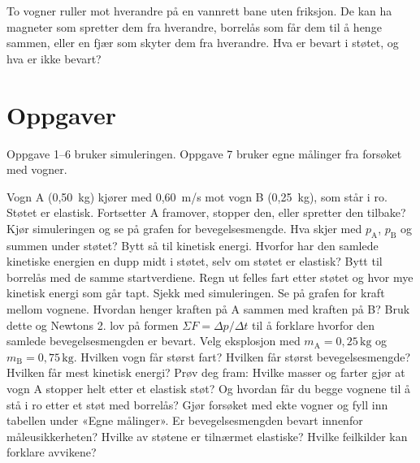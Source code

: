 \documentclass[11pt]{article}
\begin{document}

To vogner ruller mot hverandre på en vannrett bane uten friksjon. De kan ha magneter som spretter dem fra hverandre, borrelås som får dem til å henge sammen, eller en fjær som skyter dem fra hverandre. Hva er bevart i støtet, og hva er ikke bevart?

\section*{Oppgaver}

Oppgave 1–6 bruker simuleringen. Oppgave 7 bruker egne målinger fra forsøket med vogner.

\begin{oppgaveliste}
\oppgave {}Vogn A (0,50~kg) kjører med 0,60~m/s mot vogn B (0,25~kg), som står i ro. Støtet er elastisk. Fortsetter A framover, stopper den, eller spretter den tilbake?
\svar
\oppgave {}Kjør simuleringen og se på grafen for bevegelsesmengde. Hva skjer med $p_{\mathrm{A}}$, $p_{\mathrm{B}}$ og summen under støtet? Bytt så til kinetisk energi. Hvorfor har den samlede kinetiske energien en dupp midt i støtet, selv om støtet er elastisk?
\svar
\oppgave {}Bytt til borrelås med de samme startverdiene. Regn ut felles fart etter støtet og hvor mye kinetisk energi som går tapt. Sjekk med simuleringen.
\svar
\oppgave {}Se på grafen for kraft mellom vognene. Hvordan henger kraften på A sammen med kraften på B? Bruk dette og Newtons 2. lov på formen $ΣF = Δp/Δt$ til å forklare hvorfor den samlede bevegelsesmengden er bevart.
\svar
\oppgave {}Velg eksplosjon med $m_{\mathrm{A}} = 0{,}25\,\mathrm{kg}$ og $m_{\mathrm{B}} = 0{,}75\,\mathrm{kg}$. Hvilken vogn får størst fart? Hvilken får størst bevegelsesmengde? Hvilken får mest kinetisk energi?
\svar
\oppgave {}Prøv deg fram: Hvilke masser og farter gjør at vogn A stopper helt etter et elastisk støt? Og hvordan får du begge vognene til å stå i ro etter et støt med borrelås?
\svar
\oppgave {}Gjør forsøket med ekte vogner og fyll inn tabellen under «Egne målinger». Er bevegelsesmengden bevart innenfor måleusikkerheten? Hvilke av støtene er tilnærmet elastiske? Hvilke feilkilder kan forklare avvikene?
\svar
\end{oppgaveliste}
\end{document}
